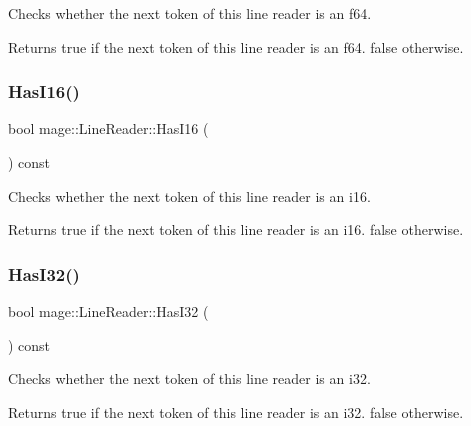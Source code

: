 Checks whether the next token of this line reader is an {\ttfamily f64}.

\begin{DoxyReturn}{Returns}
{\ttfamily true} if the next token of this line reader is an {\ttfamily f64}. {\ttfamily false} otherwise. 
\end{DoxyReturn}
\hypertarget{classmage_1_1_line_reader_a1a2ad396e48bf2db424f327141cd75e9}{}\label{classmage_1_1_line_reader_a1a2ad396e48bf2db424f327141cd75e9} 
\subsubsection{\texorpdfstring{Has\+I16()}{HasI16()}}
{\footnotesize\ttfamily bool mage\+::\+Line\+Reader\+::\+Has\+I16 (\begin{DoxyParamCaption}{ }\end{DoxyParamCaption}) const\hspace{0.3cm}{\ttfamily [protected]}}

Checks whether the next token of this line reader is an {\ttfamily i16}.

\begin{DoxyReturn}{Returns}
{\ttfamily true} if the next token of this line reader is an {\ttfamily i16}. {\ttfamily false} otherwise. 
\end{DoxyReturn}
\hypertarget{classmage_1_1_line_reader_a5034991b4599374b66bb9f70ca9d306c}{}\label{classmage_1_1_line_reader_a5034991b4599374b66bb9f70ca9d306c} 
\subsubsection{\texorpdfstring{Has\+I32()}{HasI32()}}
{\footnotesize\ttfamily bool mage\+::\+Line\+Reader\+::\+Has\+I32 (\begin{DoxyParamCaption}{ }\end{DoxyParamCaption}) const\hspace{0.3cm}{\ttfamily [protected]}}

Checks whether the next token of this line reader is an {\ttfamily i32}.

\begin{DoxyReturn}{Returns}
{\ttfamily true} if the next token of this line reader is an {\ttfamily i32}. {\ttfamily false} otherwise. 
\end{DoxyReturn}
\hypertarget{classmage_1_1_line_reader_ab9bb3be576c9c9faa0e19a8652a0f62d}{}\label{classmage_1_1_line_reader_ab9bb3be576c9c9faa0e19a8652a0f62d} 
